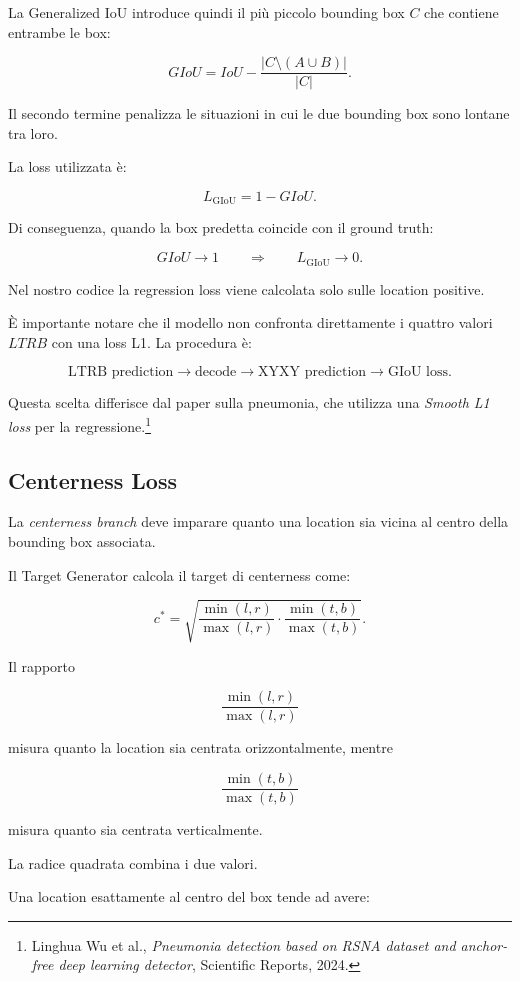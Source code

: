 La Generalized IoU introduce quindi il più piccolo bounding box $C$ che
contiene entrambe le box:

\[
GIoU =
IoU -
\frac{|C\setminus(A\cup B)|}
{|C|}.
\]

Il secondo termine penalizza le situazioni in cui le due bounding box sono
lontane tra loro.

La loss utilizzata è:

\[
L_{\text{GIoU}}=1-GIoU.
\]

Di conseguenza, quando la box predetta coincide con il ground truth:

\[
GIoU\rightarrow1
\qquad\Rightarrow\qquad
L_{\text{GIoU}}\rightarrow0.
\]

Nel nostro codice la regression loss viene calcolata solo sulle location
positive.

È importante notare che il modello non confronta direttamente i quattro valori
$LTRB$ con una loss L1. La procedura è:

\[
\text{LTRB prediction}
\rightarrow
\text{decode}
\rightarrow
\text{XYXY prediction}
\rightarrow
\text{GIoU loss}.
\]

Questa scelta differisce dal paper sulla pneumonia, che utilizza una
\textit{Smooth L1 loss} per la regressione.\footnote{Linghua Wu et al.,
\textit{Pneumonia detection based on RSNA dataset and anchor-free deep learning
detector}, Scientific Reports, 2024.}

\subsection{Centerness Loss}

La \textit{centerness branch} deve imparare quanto una location sia vicina al
centro della bounding box associata.

Il Target Generator calcola il target di centerness come:

\[
c^*
=
\sqrt{
\frac{\min(l,r)}{\max(l,r)}
\cdot
\frac{\min(t,b)}{\max(t,b)}
}.
\]

Il rapporto

\[
\frac{\min(l,r)}{\max(l,r)}
\]

misura quanto la location sia centrata orizzontalmente, mentre

\[
\frac{\min(t,b)}{\max(t,b)}
\]

misura quanto sia centrata verticalmente.

La radice quadrata combina i due valori.

Una location esattamente al centro del box tende ad avere:

